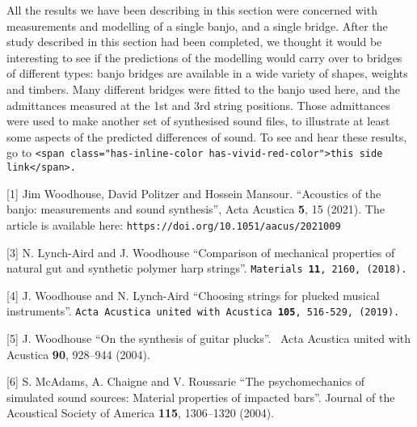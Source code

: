 
  All the results we have been describing in this section were concerned with 
  measurements and modelling of a single banjo, and a single bridge. After the 
  study described in this section had been completed, we thought it would be 
  interesting to see if the predictions of the modelling would carry over to 
  bridges of different types: banjo bridges are available in a wide variety of 
  shapes, weights and timbers. Many different bridges were fitted to the banjo 
  used here, and the admittances measured at the 1st and 3rd string positions. 
  Those admittances were used to make another set of synthesised sound files, 
  to illustrate at least some aspects of the predicted differences of sound. To 
  see and hear these results, go to \tt{}<span class="has-inline-color 
  has-vivid-red-color">this side link</span>\rm{}. 



  \sectionreferences{}[1] Jim Woodhouse, David Politzer and Hossein Mansour. 
  ``Acoustics of the banjo: measurements and sound synthesis'', Acta Acustica 
  \textbf{5}, 15 (2021). The article is available here: 
  \tt{}https://doi.org/10.1051/aacus/2021009\rm{} 

  [3] N. Lynch-Aird and J. Woodhouse ``Comparison of mechanical properties of 
  natural gut and synthetic polymer harp strings''. \tt{}Materials \textbf{11}, 2160, (2018)\rm{}.~ 

  [4] J. Woodhouse and N. Lynch-Aird ``Choosing strings for plucked musical 
  instruments''. \tt{}Acta Acustica united with Acustica 
  \textbf{105}, 516-529, (2019)\rm{}.~ 

  [5] J. Woodhouse ``On the synthesis of guitar plucks''.~ Acta Acustica united 
  with Acustica \textbf{90}, 928–944 (2004). 

  [6] S. McAdams, A. Chaigne and V. Roussarie ``The psychomechanics of 
  simulated sound sources: Material properties of impacted bars''. Journal of 
  the Acoustical Society of America \textbf{115}, 1306--1320 (2004). 